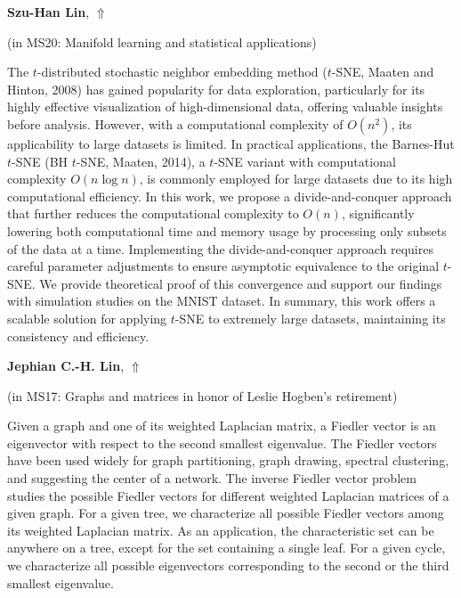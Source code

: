 \documentclass[ILAS2025-program.tex]{subfiles}
\begin{document}
     \hypertarget{down0074}{}\begin{ilasabstract}
    
    \textbf{Szu-Han Lin},  \hfill \hyperlink{up0074}{$\Uparrow$}
    
    (in {\color{mstitle}MS20: Manifold learning and statistical applications})
        
        \mtskip
    The $t$-distributed stochastic neighbor embedding method  ($t$-SNE, Maaten
and Hinton, 2008) has gained popularity for data exploration, particularly for its highly effective visualization of high-dimensional data, offering valuable insights before analysis. However, with a computational complexity of $O(n^2)$, its applicability to large datasets is limited. In practical applications, the Barnes-Hut $t$-SNE  (BH $t$-SNE, Maaten, 2014), a $t$-SNE variant with computational complexity $O(n\log n)$, is commonly employed for large datasets due to its high computational efficiency. In this work, we propose a divide-and-conquer approach that further reduces the computational complexity to $O(n)$, significantly lowering both computational time and memory usage by processing only subsets of the data at a time. Implementing the divide-and-conquer approach requires careful parameter adjustments to ensure asymptotic equivalence to the original $t$-SNE. We provide theoretical proof of this convergence and support our findings with simulation studies on the MNIST dataset. In summary, this work offers a scalable solution for applying $t$-SNE to extremely large datasets, maintaining its consistency and efficiency.
\end{ilasabstract}
     \hypertarget{down0221}{}\begin{ilasabstract}
    
    \textbf{Jephian C.-H. Lin},  \hfill \hyperlink{up0221}{$\Uparrow$}
    
    (in {\color{mstitle}MS17: Graphs and matrices in honor of Leslie Hogben's retirement})
        
        \mtskip
    Given a graph and one of its weighted Laplacian matrix, a Fiedler vector is an eigenvector with respect to the second smallest eigenvalue. The Fiedler vectors have been used widely for graph partitioning, graph drawing, spectral clustering, and suggesting the center of a network.  The inverse Fiedler vector problem studies the possible Fiedler vectors for different weighted Laplacian matrices of a given graph.  For a given tree, we characterize all possible Fiedler vectors among its weighted Laplacian matrix.  As an application, the characteristic set can be anywhere on a tree, except for the set containing a single leaf.  For a given cycle, we characterize all possible eigenvectors corresponding to the second or the third smallest eigenvalue.
\end{ilasabstract}
\end{document}
